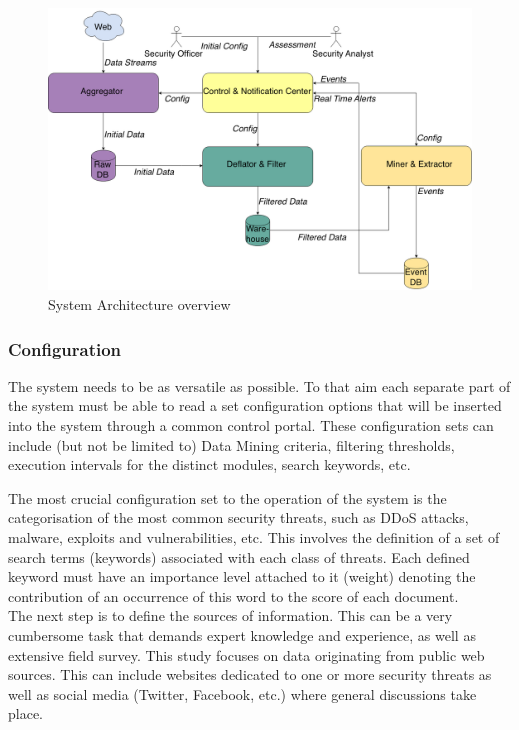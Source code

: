 \documentclass[12pt]{article}
\newcounter{subsubsubsection}[subsubsection]
\begin{document}
\begin{figure}[h]
    \centering
   \includegraphics[scale=0.33]{./images/Architecture.png}
    \caption{System Architecture overview}
    \label{fig:arch}
\end{figure}	

\newpage
\subsubsection{Configuration}
The system needs to be as versatile as possible. To that aim each separate part of the system must be able to read a set configuration options that will be inserted into the system through a common control portal. These configuration sets can include (but not be limited to) Data Mining criteria, filtering thresholds, execution intervals for the distinct modules, search keywords, etc. 



The most crucial configuration set to the operation of the system is the categorisation of the most common security threats, such as DDoS attacks, malware, exploits and vulnerabilities, etc. This involves the definition of a set of search terms (keywords) associated with each class of threats. Each defined keyword must have an importance level attached to it (weight) denoting the contribution of an occurrence of this word to the score of each document. \\

The next step is to define the sources of information. This can be a very cumbersome task that demands expert knowledge and experience, as well as extensive field survey. This study focuses on data originating from public web sources. This can include websites dedicated to one or more security threats as well as social media (Twitter, Facebook, etc.) where general discussions take place. \\
\end{document}
